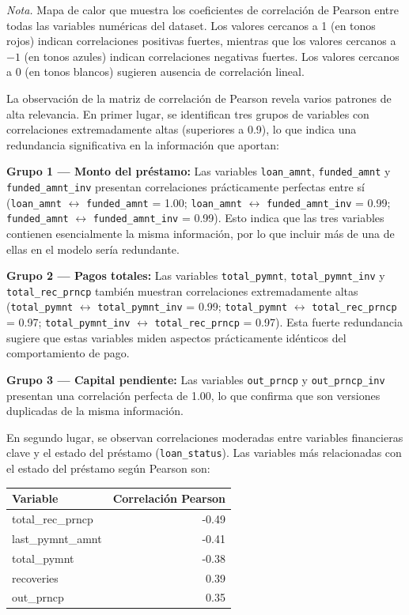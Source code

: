 \documentclass[12pt,a4paper]{article}
\begin{document}
\textit{Nota.} Mapa de calor que muestra los coeficientes de correlación de Pearson entre todas las variables numéricas del dataset. Los valores cercanos a 1 (en tonos rojos) indican correlaciones positivas fuertes, mientras que los valores cercanos a \(-1\) (en tonos azules) indican correlaciones negativas fuertes. Los valores cercanos a 0 (en tonos blancos) sugieren ausencia de correlación lineal.

La observación de la matriz de correlación de Pearson revela varios patrones de alta relevancia. En primer lugar, se identifican tres grupos de variables con correlaciones extremadamente altas (superiores a 0.9), lo que indica una redundancia significativa en la información que aportan:

\textbf{Grupo 1 --- Monto del préstamo:} Las variables \texttt{loan\_amnt}, \texttt{funded\_amnt} y \texttt{funded\_amnt\_inv} presentan correlaciones prácticamente perfectas entre sí (\texttt{loan\_amnt} \(\leftrightarrow\) \texttt{funded\_amnt} = 1.00; \texttt{loan\_amnt} \(\leftrightarrow\) \texttt{funded\_amnt\_inv} = 0.99; \texttt{funded\_amnt} \(\leftrightarrow\) \texttt{funded\_amnt\_inv} = 0.99). Esto indica que las tres variables contienen esencialmente la misma información, por lo que incluir más de una de ellas en el modelo sería redundante.

\textbf{Grupo 2 --- Pagos totales:} Las variables \texttt{total\_pymnt}, \texttt{total\_pymnt\_inv} y \texttt{total\_rec\_prncp} también muestran correlaciones extremadamente altas (\texttt{total\_pymnt} \(\leftrightarrow\) \texttt{total\_pymnt\_inv} = 0.99; \texttt{total\_pymnt} \(\leftrightarrow\) \texttt{total\_rec\_prncp} = 0.97; \texttt{total\_pymnt\_inv} \(\leftrightarrow\) \texttt{total\_rec\_prncp} = 0.97). Esta fuerte redundancia sugiere que estas variables miden aspectos prácticamente idénticos del comportamiento de pago.

\textbf{Grupo 3 --- Capital pendiente:} Las variables \texttt{out\_prncp} y \texttt{out\_prncp\_inv} presentan una correlación perfecta de 1.00, lo que confirma que son versiones duplicadas de la misma información.

En segundo lugar, se observan correlaciones moderadas entre variables financieras clave y el estado del préstamo (\texttt{loan\_status}). Las variables más relacionadas con el estado del préstamo según Pearson son:

\begin{center}
\begin{tabular}{lr}
\toprule
Variable & Correlación Pearson \\
\midrule
total\_rec\_prncp & -0.49 \\
last\_pymnt\_amnt & -0.41 \\
total\_pymnt       & -0.38 \\
recoveries         &  0.39 \\
out\_prncp         &  0.35 \\
\bottomrule
\end{tabular}
\end{center}
\end{document}

